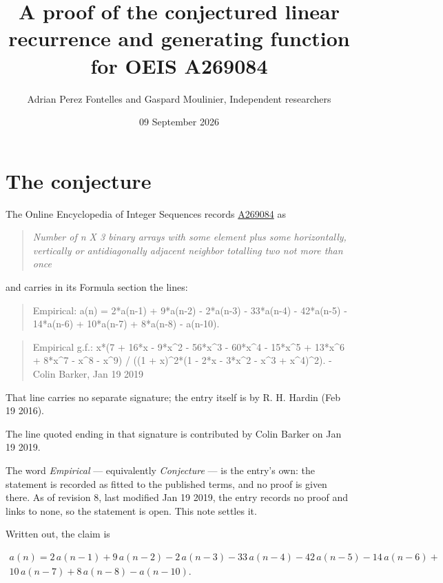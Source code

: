 \documentclass[11pt]{article}
\title{A proof of the conjectured linear recurrence and generating function for OEIS A269084}
\author{Adrian Perez Fontelles and Gaspard Moulinier, Independent researchers}
\date{09 September 2026}
\theoremstyle{definition}
\begin{document}
\maketitle
\section{The conjecture}

The Online Encyclopedia of Integer Sequences records \href{https://oeis.org/A269084}{A269084} as

\begin{quote}\itshape Number of n X 3 binary arrays with some element plus some horizontally, vertically or antidiagonally adjacent neighbor totalling two not more than once\end{quote}

and carries in its Formula section the lines:

\begin{quote}\ttfamily Empirical: a(n) = 2*a(n-1) + 9*a(n-2) - 2*a(n-3) - 33*a(n-4) - 42*a(n-5) - 14*a(n-6) + 10*a(n-7) + 8*a(n-8) - a(n-10).\end{quote}

\begin{quote}\ttfamily Empirical g.f.: x*(7 + 16*x - 9*x\textasciicircum{}2 - 56*x\textasciicircum{}3 - 60*x\textasciicircum{}4 - 15*x\textasciicircum{}5 + 13*x\textasciicircum{}6 + 8*x\textasciicircum{}7 - x\textasciicircum{}8 - x\textasciicircum{}9) / ((1 + x)\textasciicircum{}2*(1 - 2*x - 3*x\textasciicircum{}2 - x\textasciicircum{}3 + x\textasciicircum{}4)\textasciicircum{}2). - Colin Barker, Jan 19 2019\end{quote}

That line carries no separate signature; the entry itself is by R. H. Hardin (Feb 19 2016).

The line quoted ending in that signature is contributed by Colin Barker on Jan 19 2019.

The word {\itshape Empirical} --- equivalently {\itshape Conjecture} --- is the entry's own: the statement is recorded as fitted to the published terms, and no proof is given there. As of revision 8, last modified Jan 19 2019, the entry records no proof and links to none, so the statement is open. This note settles it.

Written out, the claim is

\begin{multline*} a(n) = 2\,a(n-1) + 9\,a(n-2) - 2\,a(n-3) - 33\,a(n-4) - 42\,a(n-5) - 14\,a(n-6) + \\ 10\,a(n-7) + 8\,a(n-8) - a(n-10). \end{multline*}
\end{document}
